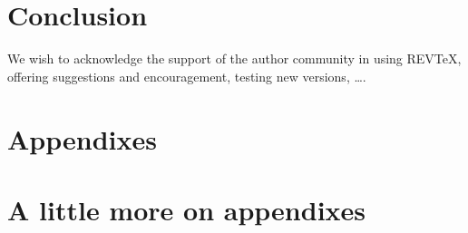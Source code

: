 \documentclass[%
 reprint,
 amsmath,amssymb,
 aps,
]{revtex4-2}
\begin{document}
\section{\label{sec:level1} Conclusion}








\begin{acknowledgments}
We wish to acknowledge the support of the author community in using
REV\TeX{}, offering suggestions and encouragement, testing new versions,
\dots.
\end{acknowledgments}

\appendix

\section{Appendixes}



\section{A little more on appendixes}



\nocite{*}



 \label{paper1}%
\end{document}
